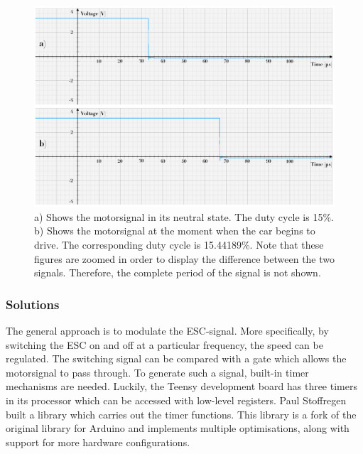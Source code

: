 \documentclass[conference,a4paper]{IEEEtran}
\begin{document}
\begin{figure}
    \includegraphics[width=\columnwidth]{SlowDriving1}
    \centering
    \caption{a) Shows the motorsignal in its neutral state. The duty cycle is 15\%. b) Shows the motorsignal at the moment when the car begins to drive. The corresponding duty cycle is 15.44189\%. Note that these figures are zoomed in order to display the difference between the two signals. Therefore, the complete period of the signal is not shown.}
    \label{fig:SlowDriving1}
\end{figure}


\subsubsection{Solutions} The general approach is to modulate the ESC-signal. More specifically, by switching the ESC on and off at a particular frequency, the speed can be regulated. The switching signal can be compared with a gate which allows the motorsignal to pass through. To generate such a signal, built-in timer mechanisms are needed. Luckily, the Teensy development board has three timers in its processor which can be accessed with low-level registers. Paul Stoffregen built a library which carries out the timer functions. This library is a fork of the original library for Arduino and implements multiple optimisations, along with support for more hardware configurations. \\
\end{document}
